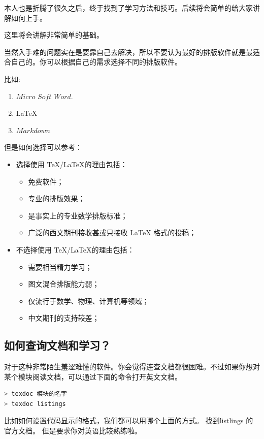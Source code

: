 \documentclass[UTF8,AutoFakeBold]{ctexart}
\numberwithin{figure}{section}
\numberwithin{table}{section}
\begin{document}
本人也是折腾了很久之后，终于找到了学习方法和技巧。后续将会简单的给大家讲解如何上手。

这里将会讲解非常简单的基础。

当然入手难的问题实在是要靠自己去解决，所以不要认为最好的排版软件就是最适合自己的。你可以根据自己的需求选择不同的排版软件。

比如:
\begin{enumerate}
    \item $Micro$ $Soft$ $Word$.
    \item \LaTeX
    \item $Markdown$
\end{enumerate}


但是如何选择可以参考：
\begin{itemize}
    \item \Checkmark 选择使用 \TeX /\LaTeX 的理由包括：

\begin{itemize}
    \item 免费软件；
    \item 专业的排版效果；
    \item 是事实上的专业数学排版标准；
    \item 广泛的西文期刊接收甚或只接收 LaTeX 格式的投稿；
\end{itemize}

\item \Checkmark 不选择使用 \TeX/\LaTeX 的理由包括：
\begin{itemize}
    \item 需要相当精力学习；
    \item 图文混合排版能力弱；
    \item 仅流行于数学、物理、计算机等领域；
    \item 中文期刊的支持较差；
\end{itemize}
\end{itemize}

\subsection{如何查询文档和学习？}
对于这种非常陌生羞涩难懂的软件。你会觉得连查文档都很困难。不过如果你想对某个模块阅读文档，可以通过下面的命令打开英文文档。

\begin{lstlisting}[language=bash]
> texdoc 模块的名字
> texdoc listings
\end{lstlisting}

比如如何设置代码显示的格式，我们都可以用哪个上面的方式。 找到listlings 的官方文档。 但是要求你对英语比较熟练啦。
\end{document}
